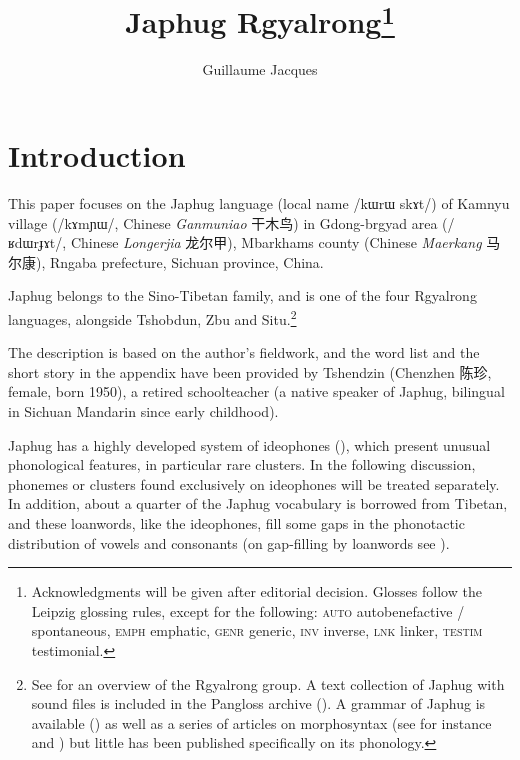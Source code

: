 \documentclass[oldfontcommands,oneside,a4paper,11pt]{article}
\newcommand{\ipa}[1]{{\phon/#1/}} %
\newcommand{\zh}[1]{{\cn #1}}
\begin{document}
 

\title{Japhug Rgyalrong\footnote{Acknowledgments will be given after editorial decision. Glosses follow the Leipzig glossing rules, except for the following: \textsc{auto} autobenefactive / spontaneous, \textsc{emph} emphatic, \textsc{genr} generic, \textsc{inv} inverse, \textsc{lnk} linker, \textsc{testim} testimonial. }}
\author{Guillaume Jacques}
\maketitle
\linenumbers
\sloppy
 \section{Introduction}
 This paper focuses on the Japhug language (local name \ipa{kɯrɯ skɤt}) of Kamnyu village (\ipa{kɤmɲɯ}, Chinese \textit{Ganmuniao} \zh{干木鸟}) in Gdong-brgyad area (\ipa{ʁdɯrɟɤt}, Chinese  \textit{Longerjia} \zh{龙尔甲}), Mbarkhams county (Chinese \textit{Maerkang} \zh{马尔康}), Rngaba prefecture, Sichuan province, China.
 
 Japhug belongs to the Sino-Tibetan family, and is one of the four Rgyalrong languages, alongside Tshobdun, Zbu and Situ.\footnote{See  \citet{jackson00sidaba} for an overview of the Rgyalrong group. A text collection of Japhug with sound files is included in the Pangloss archive (\citealt{michailovsky14pangloss}). A grammar of Japhug is available (\citealt{jacques08}) as well as a series of articles on morphosyntax (see for instance  \citealt{jacques13harmonization} and
 \citealt{jacques14antipassive}) but little has been published specifically on its phonology. } 
 
The description is based on the author’s fieldwork, and the word list and the short story in the appendix have been provided by Tshendzin (Chenzhen \zh{陈珍}, female, born 1950), a retired schoolteacher (a native speaker of Japhug, bilingual in Sichuan Mandarin since early childhood).

 Japhug has a highly  developed system of ideophones (\citealt{japhug14ideophones}), which present unusual phonological features, in particular rare clusters. In the following discussion, phonemes or clusters found exclusively on  ideophones will be treated separately. In addition, about a quarter of the Japhug vocabulary is borrowed from Tibetan, and these loanwords, like the ideophones, fill some gaps in the phonotactic distribution of vowels and consonants (on gap-filling by loanwords see \citealt[63-64]{martinet05economie}).
 
\end{document}
